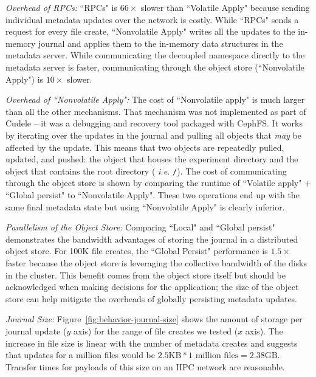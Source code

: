 {\it Overhead of RPCs:} ``RPCs" is \(66\times\) slower than ``Volatile
Apply" because sending individual metadata updates over the network is costly.
While ``RPCs" sends a request for every file create, ``Nonvolatile Apply"
writes all the updates to the in-memory journal and applies them to the
in-memory data structures in the metadata server. While communicating the
decoupled namespace directly to the metadata server is faster, communicating
through the object store (``Nonvolatile Apply") is \(10\times\) slower.

{\it Overhead of ``Nonvolatile Apply":} The cost of ``Nonvolatile
apply" is much larger than all the other mechanisms.  That mechanism was not
implemented as part of Cudele -- it was a debugging and recovery tool packaged
with CephFS. It works by iterating over the updates in the journal and pulling
all objects that {\it may} be affected by the update.  This means that two
objects are repeatedly pulled, updated, and pushed: the object that houses the
experiment directory and the object that contains the root directory ({\it
i.e.} \texttt{/}).  The cost of communicating through the object store is shown
by comparing the runtime of ``Volatile apply" + ``Global persist" to
``Nonvolatile Apply". These two operations end up with the same final metadata
state but using ``Nonvolatile Apply" is clearly inferior.

{\it Parallelism of the Object Store:} Comparing ``Local" and ``Global
persist" demonstrates the bandwidth advantages of storing the journal in a
distributed object store. For 100K file creates, the ``Global Persist"
performance is \(1.5\times\) faster because the object store is leveraging the
collective bandwidth of the disks in the cluster. This benefit comes from the
object store itself but should be acknowledged when making decisions for the
application; the size of the object store can help mitigate the overheads of
globally persisting metadata updates.

{\it Journal Size:} Figure~\ref{fig:behavior-journal-size} shows the
amount of storage per journal update (\(y\) axis) for the range of file creates
we tested (\(x\) axis). The increase in file size is linear with the number of
metadata creates and suggests that updates for a million files would be
\(2.5\text{KB}*1\text{ million files} = 2.38\text{GB}\). Transfer times for
payloads of this size on an HPC network are reasonable.\\

